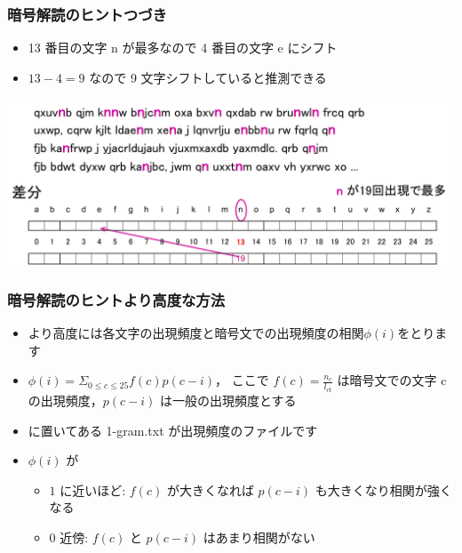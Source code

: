 \begin{frame}
\frametitle{暗号解読のヒント\textemdash つづき}
  \begin{itemize}
\item 13 番目の文字 n が最多なので 4 番目の文字 e にシフト
\item \(13-4=9\) なので 9 文字シフトしていると推測できる
  \end{itemize}
  \begin{center}
\includegraphics[scale=0.3]{./Figure/elementaryCS-figHindo.pdf}
  \end{center}
\end{frame}
\begin{frame}
\frametitle{暗号解読のヒント\textemdash より高度な方法}
  \begin{itemize}
\item より高度には各文字の出現頻度と暗号文での出現頻度の相関\(\phi(i)\)をとります
\item \(\phi(i)=\Sigma_{0\leq c\leq 25}f(c)p(c-i)\)， ここで \(f(c)=\frac{n_c}{l_{ct}}\) は暗号文での文字 c の出現頻度，\(p(c-i)\) は一般の出現頻度とする
\item \href{https://sites.google.com/presystems.xyz/elementarycs/top}{}に置いてある 1-gram.txt が出現頻度のファイルです
\item \(\phi(i)\) が
    \begin{itemize}
\item $1$ に近いほど: \(f(c)\) が大きくなれば \(p(c-i)\) も大きくなり相関が強くなる
\item $0$ 近傍: \(f(c)\) と \(p(c-i)\) はあまり相関がない
    \end{itemize}
  \end{itemize}
\end{frame}
